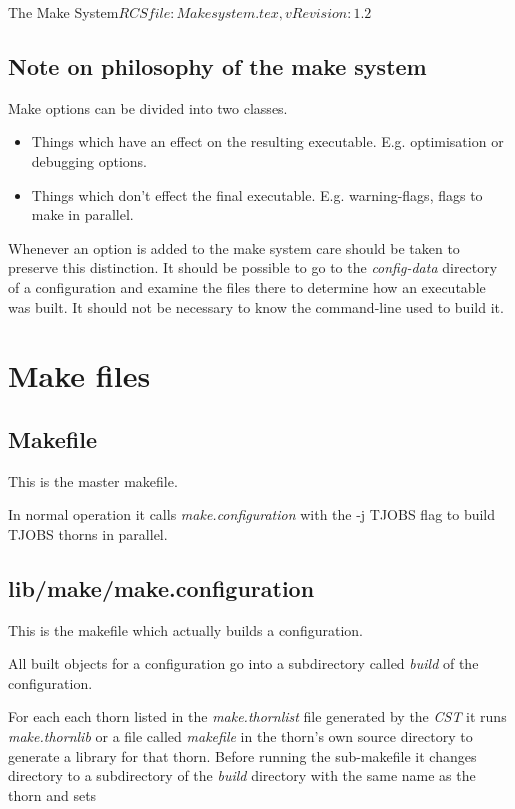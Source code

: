 \begin{cactuspart}{3}{The Make System}{$RCSfile: Makesystem.tex,v $}{$Revision: 1.2 $}
\section{Note on philosophy of the make system}

Make options can be divided into two classes.

\begin{itemize}
\item[Configuration-time options]
Things which have an effect on the resulting executable. 
E.g. optimisation or debugging options.
\item[Make-time options]
Things which don't effect the final executable.
E.g. warning-flags, flags to make in parallel.
\end{itemize}

Whenever an option is added to the make system care should be taken
to preserve this distinction.  It should be possible to go to the
{\em config-data} directory of a configuration and examine the files
there to determine how an executable was built.  It should not be
necessary to know the command-line used to build it.


\chapter{Make files}
\label{ch:makefiles}

\section{Makefile}
\label{sec:makefiles:Makefile}

This is the master makefile.  

In normal operation it calls {\em make.configuration} with the
-j TJOBS flag to build TJOBS thorns in parallel.

\section{lib/make/make.configuration}
\label{sec:makefiles:configuration}

This is the makefile which actually builds a configuration.

All built objects for a configuration go into a subdirectory called
{\em build} of the configuration.

For each each thorn listed in the {\em make.thornlist} file generated
by the {\em CST} it runs {\em make.thornlib} or a file called {\em makefile} 
in the thorn's own source directory to generate a library for
that thorn.  Before running the sub-makefile it changes directory to a subdirectory
of the {\em build} directory with the same name as the thorn and sets


\end{cactuspart}

